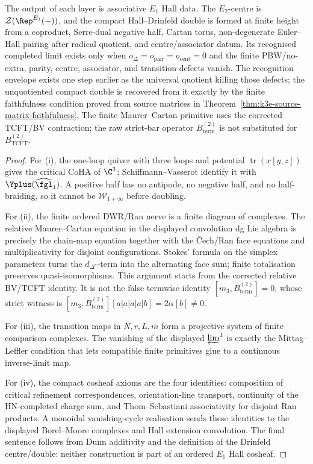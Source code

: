 \begin{proposition}
The output of each layer is associative \(E_1\) Hall data. The
\(E_2\)-centre is
\(\mathcal Z(\Rep^{E_1}(-))\), and the compact Hall--Drinfeld double is
formed at finite height from a coproduct, Serre-dual negative half,
Cartan torus, non-degenerate Euler--Hall pairing after radical
quotient, and centre/associator datum. Its recognised completed limit
exists only when
$o_\Delta=o_{\mathrm{pair}}=o_{\mathrm{cent}}=0$ and the finite
PBW/no-extra, parity, centre, associator, and transition defects
vanish. The recognition envelope exists one step earlier as the
universal quotient killing those defects; the unquotiented compact
double is recovered from it exactly by the finite faithfulness
condition proved from source matrices in
Theorem~\ref{thm:k3e-source-matrix-faithfulness}.
The finite Maurer--Cartan primitive uses the corrected TCFT/BV
contraction; the raw strict-bar operator
\(B_{\mathrm{term}}^{(2)}\) is not substituted for
\(B_{\mathrm{TCFT}}^{(2)}\).
\end{proposition}

\begin{proof}
For (i), the one-loop quiver with three loops and potential
\(\operatorname{tr}(x[y,z])\) gives the critical CoHA of \(\C^3\);
Schiffmann--Vasserot identify it with
\(\Yplus(\widehat{\fgl}_1)\). A positive half has no antipode, no
negative half, and no half-braiding, so it cannot be
\(\mathcal W_{1+\infty}\) before doubling.

For (ii), the finite ordered DWR/Ran nerve is a finite diagram of
complexes. The relative Maurer--Cartan equation in the displayed
convolution dg Lie algebra is precisely the chain-map equation
together with the \v{C}ech/Ran face equations and multiplicativity for
disjoint configurations. Stokes' formula on the simplex parameters
turns the \(d_{\Delta^p}\)-term into the alternating face sum; finite
totalisation preserves quasi-isomorphisms. This argument starts from
the corrected relative BV/TCFT identity. It is not the false termwise
identity \([m_3,B_{\mathrm{term}}^{(2)}]=0\), whose strict witness is
\([m_3,B_{\mathrm{term}}^{(2)}][a|a|a|a|b]=2\alpha[b]\neq0\).

For (iii), the transition maps in \(N,r,L,m\) form a projective system
of finite comparison complexes. The vanishing of the displayed
\(\varprojlim^1\) is exactly the Mittag--Leffler condition that lets
compatible finite primitives glue to a continuous inverse-limit map.

For (iv), the compact cosheaf axioms are the four identities:
composition of critical refinement correspondences, orientation-line
transport, continuity of the HN-completed charge sum, and
Thom--Sebastiani associativity for disjoint Ran products. A monoidal
vanishing-cycle realisation sends these identities to the displayed
Borel--Moore complexes and Hall extension convolution. The final
sentence follows from Dunn additivity and the definition of the
Drinfeld centre/double: neither construction is part of an ordered
\(E_1\) Hall cosheaf.
\end{proof}

